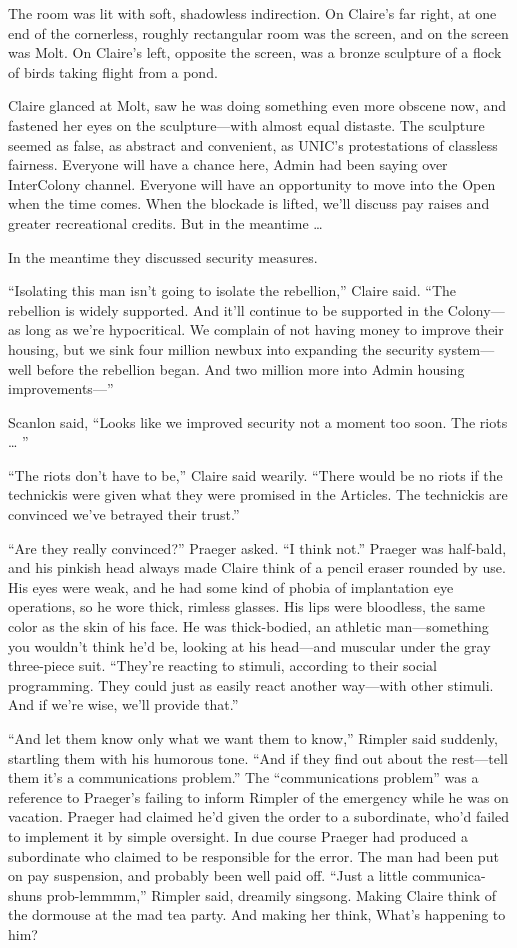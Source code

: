 The room was lit with soft, shadowless indirection. On Claire’s far right, at one end of the cornerless, roughly rectangular room was the screen, and on the screen was Molt. On Claire’s left, opposite the screen, was a bronze sculpture of a flock of birds taking flight from a pond.

Claire glanced at Molt, saw he was doing something even more obscene now, and fastened her eyes on the sculpture—with almost equal distaste. The sculpture seemed as false, as abstract and convenient, as UNIC’s protestations of classless fairness. Everyone will have a chance here, Admin had been saying over InterColony channel. Everyone will have an opportunity to move into the Open when the time comes. When the blockade is lifted, we’ll discuss pay raises and greater recreational credits. But in the meantime …

In the meantime they discussed security measures.

“Isolating this man isn’t going to isolate the rebellion,” Claire said. “The rebellion is widely supported. And it’ll continue to be supported in the Colony—as long as we’re hypocritical. We complain of not having money to improve their housing, but we sink four million newbux into expanding the security system—well before the rebellion began. And two million more into Admin housing improvements—”

Scanlon said, “Looks like we improved security not a moment too soon. The riots … ”

“The riots don’t have to be,” Claire said wearily. “There would be no riots if the technickis were given what they were promised in the Articles. The technickis are convinced we’ve betrayed their trust.”

“Are they really convinced?” Praeger asked. “I think not.” Praeger was half-bald, and his pinkish head always made Claire think of a pencil eraser rounded by use. His eyes were weak, and he had some kind of phobia of implantation eye operations, so he wore thick, rimless glasses. His lips were bloodless, the same color as the skin of his face. He was thick-bodied, an athletic man—something you wouldn’t think he’d be, looking at his head—and muscular under the gray three-piece suit. “They’re reacting to stimuli, according to their social programming. They could just as easily react another way—with other stimuli. And if we’re wise, we’ll provide that.”

“And let them know only what we want them to know,” Rimpler said suddenly, startling them with his humorous tone. “And if they find out about the rest—tell them it’s a communications problem.” The “communications problem” was a reference to Praeger’s failing to inform Rimpler of the emergency while he was on vacation. Praeger had claimed he’d given the order to a subordinate, who’d failed to implement it by simple oversight. In due course Praeger had produced a subordinate who claimed to be responsible for the error. The man had been put on pay suspension, and probably been well paid off. “Just a little communica-shuns prob-lemmmm,” Rimpler said, dreamily singsong. Making Claire think of the dormouse at the mad tea party. And making her think, What’s happening to him?


